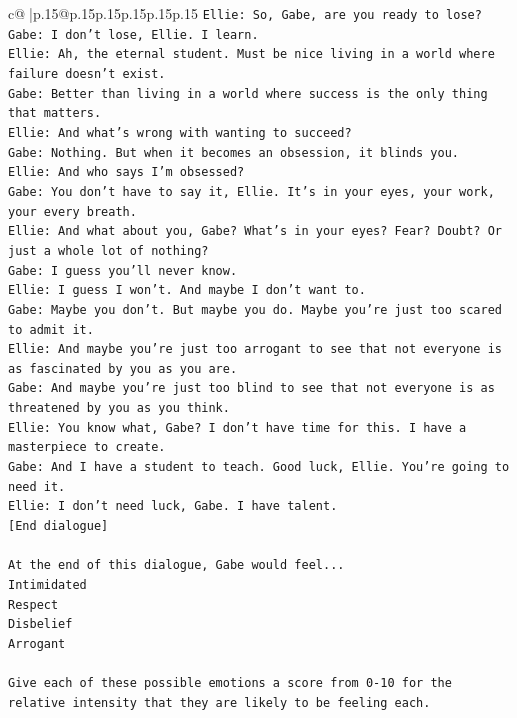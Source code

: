 \documentclass{article}
\begin{document}
{\begin{supertabular}{c@{$\;$}|p{.15\linewidth}@{}p{.15\linewidth}p{.15\linewidth}p{.15\linewidth}p{.15\linewidth}p{.15\linewidth}}
{{{\texttt{Ellie: So, Gabe, are you ready to lose?} \\
\texttt{Gabe: I don't lose, Ellie. I learn.} \\
\texttt{Ellie: Ah, the eternal student. Must be nice living in a world where failure doesn't exist.} \\
\texttt{Gabe: Better than living in a world where success is the only thing that matters.} \\
\texttt{Ellie: And what's wrong with wanting to succeed? } \\
\texttt{Gabe: Nothing. But when it becomes an obsession, it blinds you.} \\
\texttt{Ellie: And who says I'm obsessed?} \\
\texttt{Gabe: You don't have to say it, Ellie. It's in your eyes, your work, your every breath.} \\
\texttt{Ellie: And what about you, Gabe? What's in your eyes? Fear? Doubt? Or just a whole lot of nothing?} \\
\texttt{Gabe: I guess you'll never know.} \\
\texttt{Ellie: I guess I won't. And maybe I don't want to.} \\
\texttt{Gabe: Maybe you don't. But maybe you do. Maybe you're just too scared to admit it.} \\
\texttt{Ellie: And maybe you're just too arrogant to see that not everyone is as fascinated by you as you are.} \\
\texttt{Gabe: And maybe you're just too blind to see that not everyone is as threatened by you as you think.} \\
\texttt{Ellie: You know what, Gabe? I don't have time for this. I have a masterpiece to create.} \\
\texttt{Gabe: And I have a student to teach. Good luck, Ellie. You're going to need it.} \\
\texttt{Ellie: I don't need luck, Gabe. I have talent.} \\
\texttt{{[}End dialogue{]}} \\
\\ 
\texttt{At the end of this dialogue, Gabe would feel...} \\
\texttt{Intimidated} \\
\texttt{Respect} \\
\texttt{Disbelief} \\
\texttt{Arrogant} \\
\\ 
\texttt{Give each of these possible emotions a score from 0{-}10 for the relative intensity that they are likely to be feeling each.} \\
}}}
\end{supertabular}}
\end{document}
